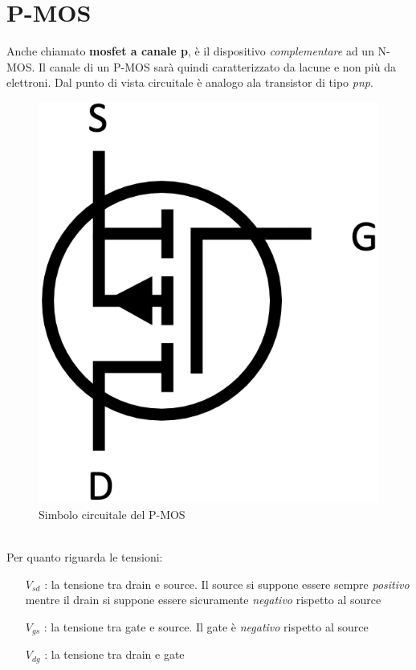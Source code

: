 \documentclass[12pt, a4paper]{report}
\begin{document}
\section{P-MOS}
Anche chiamato \textbf{mosfet a canale p}, è il dispositivo \textit{complementare} ad un N-MOS. Il canale di un P-MOS sarà quindi caratterizzato da lacune e non più da elettroni. Dal punto di vista circuitale è analogo ala transistor di tipo \textit{pnp}.
\begin{figure}[h]
    \centering
    \includegraphics[scale=0.35,angle=0]{p_mos_simbolo.png}
    \caption{Simbolo circuitale del P-MOS}
\end{figure}
\\Per quanto riguarda le tensioni:
\begin{itemize}
    \item[$V_{sd}$]: la tensione tra drain e source. Il source si suppone essere sempre \textit{positivo} mentre il drain si suppone essere sicuramente \textit{negativo} rispetto al source
    \item[$V_{gs}$]: la tensione tra gate e source. Il gate è \textit{negativo} rispetto al source
    \item[$V_{dg}$]: la tensione tra drain e gate
\end{itemize}
\end{document}
